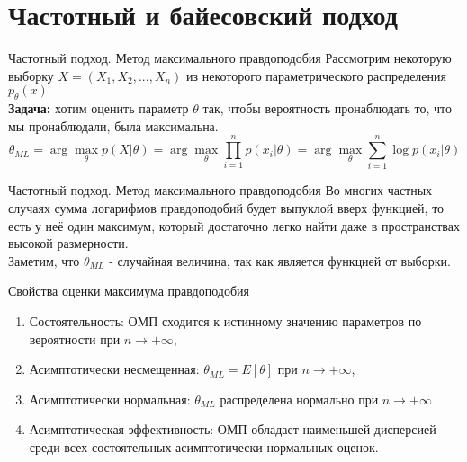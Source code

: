 \documentclass[russian]{vegapresentation}
\begin{document}
    \section{Частотный и байесовский подход}

    \begin{frame}{Частотный подход. Метод максимального правдоподобия}
        Рассмотрим некоторую выборку $X=(X_1, X_2, ..., X_n)$ из некоторого параметрического распределения $p_\theta(x)$ \\
        \vspace{3mm}
        \textbf{Задача:} хотим оценить параметр $\theta$ так, чтобы вероятность пронаблюдать то, что мы пронаблюдали, была максимальна. \\
        \begin{equation}
                    \theta_{ML} = \arg\max_{\theta}p(X|\theta) = \arg\max_{\theta} \prod\limits_{i=1}^{n}p(x_i|\theta) = \arg\max_{\theta} \sum\limits_{i=1}^{n}\log p(x_i|\theta)
         \end{equation}
    \end{frame}
    
    \begin{frame}{Частотный подход. Метод максимального правдоподобия}
		Во многих частных случаях сумма логарифмов правдоподобий будет выпуклой вверх функцией, то есть у неё один максимум, который достаточно легко найти даже в пространствах высокой размерности. \\
		\vspace{3mm}
		Заметим, что $\theta_{ML}$ - случайная величина, так как является функцией от выборки.
    \end{frame}
    
	\begin{frame}{Свойства оценки максимума правдоподобия}
		\begin{enumerate}
         	\item Состоятельность: ОМП сходится к истинному значению параметров по вероятности при $n\rightarrow+\infty$,
			\item Асимптотически несмещенная: $\theta_{ML} = E[\theta]$ при $n\rightarrow+\infty$,
			\item Асимптотически нормальная: $\theta_{ML}$ распределена нормально при $n\rightarrow+\infty$
			\item Асимптотическая эффективность: ОМП обладает наименьшей дисперсией среди всех состоятельных асимптотически нормальных оценок.
         \end{enumerate}
    \end{frame}
    
\end{document}
